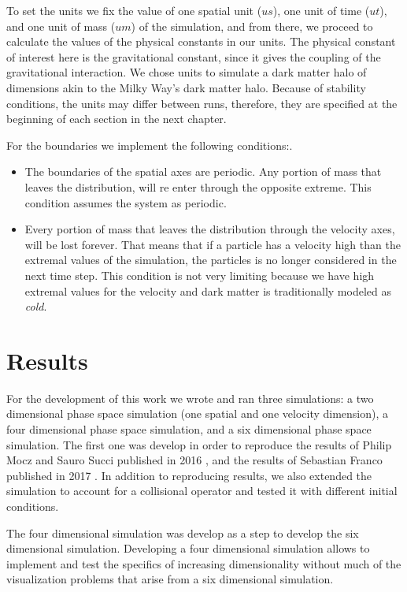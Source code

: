 To set the units we fix the value of one spatial unit ($us$), one unit of time ($ut$), and one unit of mass ($um$) of the simulation, and from there, we proceed to calculate the values of the physical constants in our units.
The physical constant of interest here is the gravitational constant, since it gives the coupling of the gravitational interaction.
We chose units to simulate a dark matter halo of dimensions akin to the Milky Way's dark matter halo. Because of stability conditions, the units may differ between runs, therefore, they are specified at the beginning of each section in the next chapter.

For the boundaries we implement the following conditions:.
\begin{itemize}
\item The boundaries of the spatial axes are periodic. Any portion of mass that leaves the distribution, will re enter through the opposite extreme. This condition assumes the system as periodic.
\item Every portion of mass that leaves the distribution through the velocity axes, will be lost forever. That means that if a particle has a velocity high than the extremal values of the simulation, the particles is no longer considered in the next time step. This condition is not very limiting because we have high extremal values for the velocity and dark matter is traditionally modeled as \emph{cold}.
\end{itemize}


\chapter{Results}
For the development of this work we wrote and ran three simulations: a  two dimensional phase space simulation (one spatial and one velocity dimension), a four dimensional phase space simulation, and a six dimensional phase space simulation. 
The first one was develop in order to reproduce the results of Philip Mocz and Sauro Succi published in 2016 \cite{integerLatticeDynamics}, and the results of Sebastian Franco published in 2017 \cite{franco}.
In addition to reproducing results, we also extended the simulation to account for a collisional operator and tested it with different initial conditions.

The four dimensional simulation was develop as a step to develop the six dimensional simulation. Developing a four dimensional simulation allows to implement and test the specifics of increasing dimensionality without much of the visualization problems that arise from a six dimensional simulation. 

